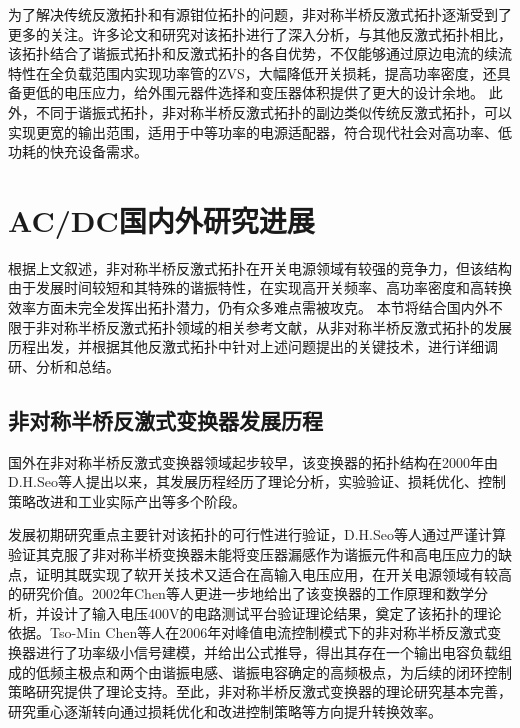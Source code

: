 为了解决传统反激拓扑和有源钳位拓扑的问题，非对称半桥反激式拓扑逐渐受到了更多的关注。许多论文和研究对该拓扑进行了深入分析\cite{chen2002analysis,kim2012analysis,huber2017analysis}，与其他反激式拓扑相比，该拓扑结合了谐振式拓扑和反激式拓扑的各自优势，不仅能够通过原边电流的续流特性在全负载范围内实现功率管的ZVS，大幅降低开关损耗，提高功率密度，还具备更低的电压应力，给外围元器件选择和变压器体积提供了更大的设计余地。
此外，不同于谐振式拓扑，非对称半桥反激式拓扑的副边类似传统反激式拓扑，可以实现更宽的输出范围，适用于中等功率的电源适配器，符合现代社会对高功率、低功耗的快充设备需求。

\section{AC/DC国内外研究进展}

根据上文叙述，非对称半桥反激式拓扑在开关电源领域有较强的竞争力，但该结构由于发展时间较短和其特殊的谐振特性，在实现高开关频率、高功率密度和高转换效率方面未完全发挥出拓扑潜力，仍有众多难点需被攻克。
本节将结合国内外不限于非对称半桥反激式拓扑领域的相关参考文献，从非对称半桥反激式拓扑的发展历程出发，并根据其他反激式拓扑中针对上述问题提出的关键技术，进行详细调研、分析和总结。

\subsection{非对称半桥反激式变换器发展历程}

国外在非对称半桥反激式变换器领域起步较早，该变换器的拓扑结构在2000年由D.H.Seo等人提出以来，其发展历程经历了理论分析，实验验证、损耗优化、控制策略改进和工业实际产出等多个阶段。

发展初期研究重点主要针对该拓扑的可行性进行验证，D.H.Seo等人\cite{seo2000_AHB}通过严谨计算验证其克服了非对称半桥变换器未能将变压器漏感作为谐振元件和高电压应力的缺点，证明其既实现了软开关技术又适合在高输入电压应用，在开关电源领域有较高的研究价值。2002年Chen等人\cite{chen2002_AHB,chen2002_AHB1}更进一步地给出了该变换器的工作原理和数学分析，并设计了输入电压400V的电路测试平台验证理论结果，奠定了该拓扑的理论依据。Tso-Min Chen等人\cite{chen2006_AHB}在2006年对峰值电流控制模式下的非对称半桥反激式变换器进行了功率级小信号建模，并给出公式推导，得出其存在一个输出电容负载组成的低频主极点和两个由谐振电感、谐振电容确定的高频极点，为后续的闭环控制策略研究提供了理论支持。至此，非对称半桥反激式变换器的理论研究基本完善，研究重心逐渐转向通过损耗优化和改进控制策略等方向提升转换效率。

